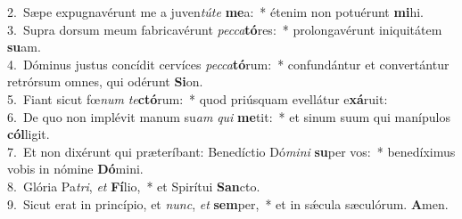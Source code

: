 {2.~}Sæpe expugnavérunt me a juven\textit{tú}\textit{te} \textbf{me}a:~* étenim non potuérunt \textbf{mi}hi.\\
{3.~}Supra dorsum meum fabricavérunt \textit{pec}\textit{ca}\textbf{tó}res:~* prolongavérunt iniquitátem \textbf{su}am.\\
{4.~}Dóminus justus concídit cervíces \textit{pec}\textit{ca}\textbf{tó}rum:~* confundántur et convertántur retrórsum omnes, qui odérunt \textbf{Si}on.\\
{5.~}Fiant sicut fœ\textit{num} \textit{te}\textbf{ctó}rum:~* quod priúsquam evellátur e\textbf{xá}ruit:\\
{6.~}De quo non implévit manum su\textit{am} \textit{qui} \textbf{me}tit:~* et sinum suum qui manípulos \textbf{cól}ligit.\\
{7.~}Et non dixérunt qui præteríbant: Benedíctio Dó\textit{mi}\textit{ni} \textbf{su}per vos:~* benedíximus vobis in nómine \textbf{Dó}mini.\\
{8.~}Glória Pa\textit{tri}, \textit{et} \textbf{Fí}lio,~* et Spirítui \textbf{San}cto.\\
{9.~}Sicut erat in princípio, et \textit{nunc}, \textit{et} \textbf{sem}per,~* et in sǽcula sæculórum. \textbf{A}men.\\
